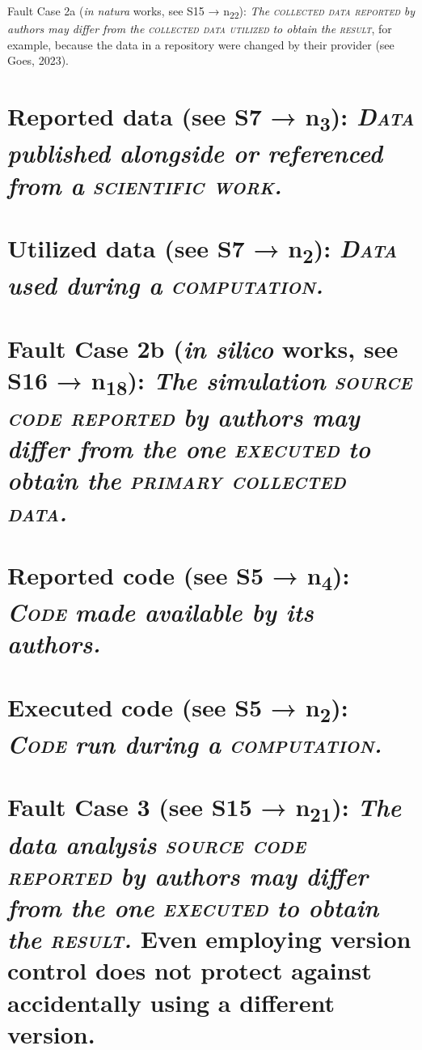 \documentclass[authordate, empirical]{jote-new-article}
\begin{document}
	Fault Case 2a (\emph{in natura} works, see S15 → n\textsubscript{22}): \emph{The }\textsc{\emph{collected data reported}}\emph{ by authors may differ from the }\textsc{\emph{collected data utilized }}\emph{to obtain the }\textsc{\emph{result}}, for example, because the data in a repository were changed by their provider (see Goes, 2023).



	\section{\textbf{Reported data} (see S7 → n\textsubscript{3}): \textsc{\emph{Data}}\emph{ published alongside or referenced from a }\textsc{\emph{scientific work}}\emph{.}}



	\section{\textbf{Utilized data} (see S7 → n\textsubscript{2}): \textsc{\emph{Data}}\emph{ used during a }\textsc{\emph{computation}}\emph{.}}



	\section{Fault Case 2b (\emph{in silico} works, see S16 → n\textsubscript{18}): \emph{The simulation }\textsc{\emph{source code reported}}\emph{ by authors may differ from the one }\textsc{\emph{executed}}\emph{ to obtain the }\textsc{\emph{primary collected data}}\emph{.}}



	\section{\textbf{Reported code} (see S5 → n\textsubscript{4}): \textsc{\emph{Code}}\emph{ made available by its authors.}}



	\section{\textbf{Executed code} (see S5 → n\textsubscript{2}): \textsc{\emph{Code}}\emph{ run during a }\textsc{\emph{computation}}\emph{.}}



	\section{Fault Case 3 (see S15 → n\textsubscript{21}): \emph{The data analysis }\textsc{\emph{source code reported}}\emph{ by authors may differ from the one }\textsc{\emph{executed}}\emph{ to obtain the }\textsc{\emph{result}}\emph{.} Even employing version control does not protect against accidentally using a different version.}
\end{document}
